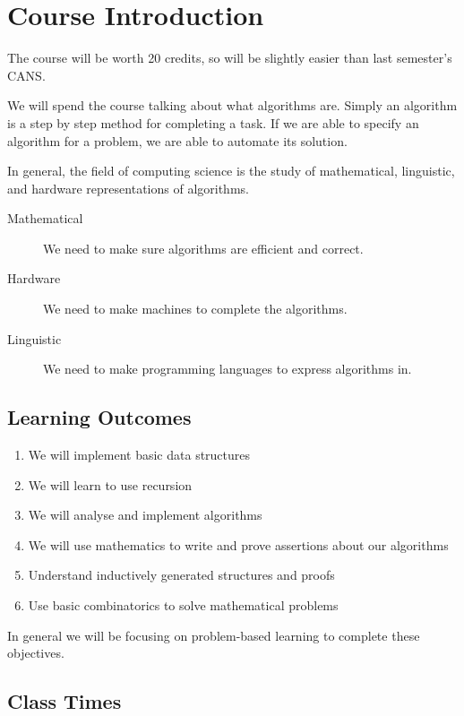 \section{Course Introduction}\label{sec:course_introduction}

The course will be worth 20 credits, so will be slightly easier than last semester's CANS.

We will spend the course talking about what algorithms are.
Simply an algorithm is a  step by step method for completing a task.
If we are able to specify an algorithm for a problem, we are able to automate its solution.

In general, the field of computing science is the study of mathematical, linguistic, and hardware representations of algorithms.
\begin{description}
    \item[Mathematical] We need to make sure algorithms are efficient and correct.
    \item[Hardware] We need to make machines to complete the algorithms.
    \item[Linguistic] We need to make programming languages to express algorithms in.
\end{description}

\subsection{Learning Outcomes}\label{sub:learning_outcomes}

\begin{enumerate}
    \item We will implement basic data structures
    \item We will learn to use recursion
    \item We will analyse and implement algorithms
    \item We will use mathematics to write and prove assertions about our algorithms
    \item Understand inductively generated structures and proofs
    \item Use basic combinatorics to solve mathematical problems
\end{enumerate}

In general we will be focusing on problem-based learning to complete these objectives.

\subsection{Class Times}\label{sub:class_times}


